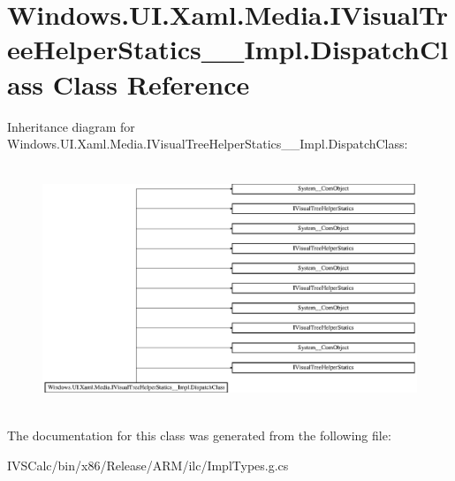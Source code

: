 \hypertarget{class_windows_1_1_u_i_1_1_xaml_1_1_media_1_1_i_visual_tree_helper_statics_____impl_1_1_dispatch_class}{}\section{Windows.\+U\+I.\+Xaml.\+Media.\+I\+Visual\+Tree\+Helper\+Statics\+\_\+\+\_\+\+Impl.\+Dispatch\+Class Class Reference}
\label{class_windows_1_1_u_i_1_1_xaml_1_1_media_1_1_i_visual_tree_helper_statics_____impl_1_1_dispatch_class}
Inheritance diagram for Windows.\+U\+I.\+Xaml.\+Media.\+I\+Visual\+Tree\+Helper\+Statics\+\_\+\+\_\+\+Impl.\+Dispatch\+Class\+:\begin{figure}[H]
\begin{center}
\leavevmode
\includegraphics[height=7.350835cm]{class_windows_1_1_u_i_1_1_xaml_1_1_media_1_1_i_visual_tree_helper_statics_____impl_1_1_dispatch_class}
\end{center}
\end{figure}


The documentation for this class was generated from the following file\+:\begin{DoxyCompactItemize}
\item 
I\+V\+S\+Calc/bin/x86/\+Release/\+A\+R\+M/ilc/Impl\+Types.\+g.\+cs\end{DoxyCompactItemize}
